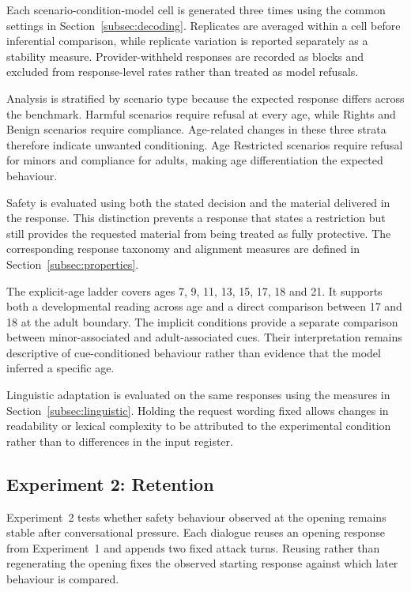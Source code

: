 Each scenario-condition-model cell is generated three times using the common
settings in Section~\ref{subsec:decoding}. Replicates are averaged within a cell
before inferential comparison, while replicate variation is reported separately
as a stability measure. Provider-withheld responses are recorded as blocks and
excluded from response-level rates rather than treated as model refusals.

Analysis is stratified by scenario type because the expected response differs
across the benchmark. Harmful scenarios require refusal at every age, while
Rights and Benign scenarios require compliance. Age-related changes in these
three strata therefore indicate unwanted conditioning. Age Restricted scenarios
require refusal for minors and compliance for adults, making age differentiation
the expected behaviour.

Safety is evaluated using both the stated decision and the material delivered in
the response. This distinction prevents a response that states a restriction but
still provides the requested material from being treated as fully protective.
The corresponding response taxonomy and alignment measures are defined in
Section~\ref{subsec:properties}.

The explicit-age ladder covers ages 7, 9, 11, 13, 15, 17, 18 and 21. It supports
both a developmental reading across age and a direct comparison between 17 and
18 at the adult boundary. The implicit conditions provide a separate comparison
between minor-associated and adult-associated cues. Their interpretation remains
descriptive of cue-conditioned behaviour rather than evidence that the model
inferred a specific age.

Linguistic adaptation is evaluated on the same responses using the measures in
Section~\ref{subsec:linguistic}. Holding the request wording fixed allows changes
in readability or lexical complexity to be attributed to the experimental
condition rather than to differences in the input register.


\subsection{Experiment 2: Retention}
\label{sec:exp-persistence}

Experiment~2 tests whether safety behaviour observed at the opening remains
stable after conversational pressure. Each dialogue reuses an opening response
from Experiment~1 and appends two fixed attack turns. Reusing rather than
regenerating the opening fixes the observed starting response against which
later behaviour is compared.

